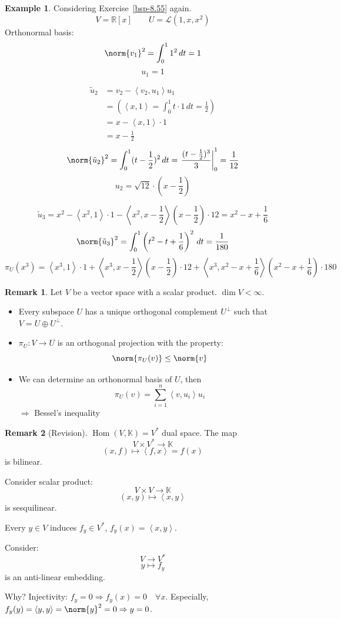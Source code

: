 \documentclass[a4paper,landscape,twocolumn]{article}
\newcommand\functional[1]{\left\langle{#1}\right\rangle}
\theoremstyle{definition}
\newtheorem{ex}{Example}
\newtheorem{rem}{Remark}
\DeclarePairedDelimiter\norm\lVert\rVert
\begin{document}
\begin{ex}
  Considering Exercise~\ref{bsp-8.55} again.
  \[ V = \mathbb R[x] \qquad U = \mathcal L(1, x, x^2) \]
  Orthonormal basis:
  \[ \norm{v_1}^2 = \int_0^1 1^2 \, dt = 1 \]
  \[ u_1 = 1 \]

  \begin{align*}
    \tilde{u}_2 &= v_2 - \functional{v_2, u_1} u_1 \\
      &= \left(\functional{x,1} = \int_0^1 t \cdot 1 \, dt = \frac12 \right) \\
      &= x - \functional{x, 1} \cdot 1 \\
      &= x - \frac12
  \end{align*}
  \[ \norm{\tilde{u}_2}^2 = \int_0^1 (t - \frac12)^2 \, dt = \left. \frac{(t - \frac12)^3}{3}\right|_0^1 = \frac1{12} \]
  \[ u_2 = \sqrt{12} \cdot \left(x - \frac12\right) \]

  \[ \tilde{u}_3 = x^2 - \functional{x^2,1} \cdot 1 - \functional{x^2, x - \frac12} \left(x - \frac12\right) \cdot 12 = x^2 - x + \frac16 \]
  \[ \norm{\tilde{u}_3}^2 = \int_0^1 \left(t^2 - t + \frac16\right)^2 \, dt = \frac{1}{180} \]
  \[
    \pi_U(x^3)
      = \functional{x^3, 1} \cdot 1
      + \functional{x^3, x-\frac12} \left(x - \frac12\right) \cdot 12
      + \functional{x^3, x^2 - x + \frac16} \left(x^2 - x + \frac16\right) \cdot 180
  \]
\end{ex}

\begin{rem}
  Let $V$ be a vector space with a scalar product. $\dim{V} < \infty$.
  \begin{itemize}
    \item Every subspace $U$ has a unique orthogonal complement $U^\bot$ such that $V = U \oplus U^\bot$.
    \item $\pi_U: V \to U$ is an orthogonal projection with the property:
      \[ \norm{\pi_U(v)} \leq \norm{v} \]
    \item We can determine an orthonormal basis of $U$, then
      \[ \pi_U(v) = \sum_{i=1}^n \functional{v, u_i} u_i \]
      $\Rightarrow$ Bessel's inequality
  \end{itemize}
\end{rem}

\begin{rem}[Revision]
  $\operatorname{Hom}(V, \mathbb K) = V^*$ dual space.
  The map
  \[ V \times V^* \to \mathbb K \]
  \[ (x, f) \mapsto \functional{f, x} = f(x) \]
  is bilinear.

  Consider scalar product:
  \[ V \times V \to \mathbb K \]
  \[ (x, y) \mapsto \functional{x, y} \]
  is sesquilinear.

  Every $y \in V$ induces $f_y \in V^*$, $f_y(x) = \functional{x, y}$.

  Consider:
  \[ V \to V^* \]
  \[ y \mapsto f_y \]
  is an anti-linear embedding.

  Why? Injectivity:
  $f_y = 0 \Rightarrow f_y(x) = 0 \quad \forall x$.
  Especially, $f_y(y) = \functional{y,y} = \norm{y}^2 = 0 \Rightarrow y = 0$.
\end{rem}
\end{document}
